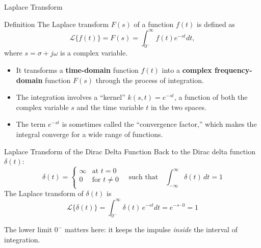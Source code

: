 \documentclass[12pt, aspectratio=169]{beamer}
\begin{document}
\begin{frame}{Laplace Transform}
    \begin{alertblock}{Definition}
        The Laplace transform $F(s)$ of a function $f(t)$ is defined as $$\mathcal{L}\{f(t)\} = F(s) = \int_{0^-}^{\infty} f(t)e^{-st}dt,$$
        where $s = \sigma + j\omega$ is a complex variable.
    \end{alertblock} 
    \begin{itemize}
        \item It transforms a \textbf{time-domain} function $f(t)$ into a \textbf{complex frequency-domain} function $F(s)$ through the process of integration.
        \item The integration involves a ``kernel'' $k(s,t) = e^{-st}$, a function of both the complex variable $s$ and the time variable $t$ in the two spaces.
        \item The term $e^{-st}$ is sometimes called the ``convergence factor,'' which makes the integral converge for a wide range of functions.
    \end{itemize}
\end{frame}

\begin{frame}{Laplace Transform of the Dirac Delta Function}
    Back to the Dirac delta function $\delta(t)$:
    \[
        \delta(t) =
        \begin{cases}
            \infty & \text{at } t = 0 \\
            0                     & \text{for } t \neq 0 \\
        \end{cases}
        \quad\text{such that}\quad
        \int_{-\infty}^{\infty}\!\delta(t)\,dt = 1
    \]
    The Laplace transform of $\delta(t)$ is    
    $$\mathcal{L}\{\delta(t)\} = \int_{0^-}^{\infty} \delta(t)\,e^{-st}dt = e^{-s \cdot 0} = 1$$
    \vspace{-0.5em}
    \begin{center}
        \small The lower limit $0^-$ matters here: it keeps the impulse \emph{inside} the
        interval of integration.
    \end{center}
\end{frame}

\newcommand{\sisoBlock}[3]{%
    \begin{tikzpicture}[>=latex',
        block/.style={draw, rectangle, minimum height=2.8em, minimum width=6.5em}]
        \node [block] (sys) {#1};
        \draw [->] ([xshift=-3.4cm]sys.west) -- node [above] {#2} (sys.west);
        \draw [->] (sys.east) -- node [above] {#3} ([xshift=3.4cm]sys.east);
    \end{tikzpicture}%
}
\end{document}
